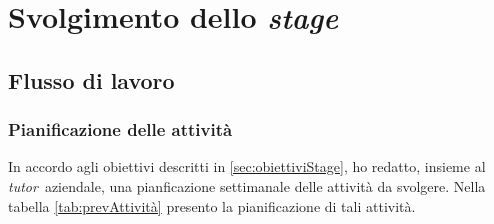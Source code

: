 \chapter{Svolgimento dello \textit{stage}} 
\label{cap:descrizione-stage}


\section{Flusso di lavoro}
\subsection{Pianificazione delle attività}
In accordo agli obiettivi descritti in \ref{sec:obiettiviStage}, ho redatto, insieme al \textit{tutor} aziendale, una pianficazione settimanale delle attività da svolgere.
Nella tabella \ref{tab:prevAttività} presento la pianificazione di tali attività.


